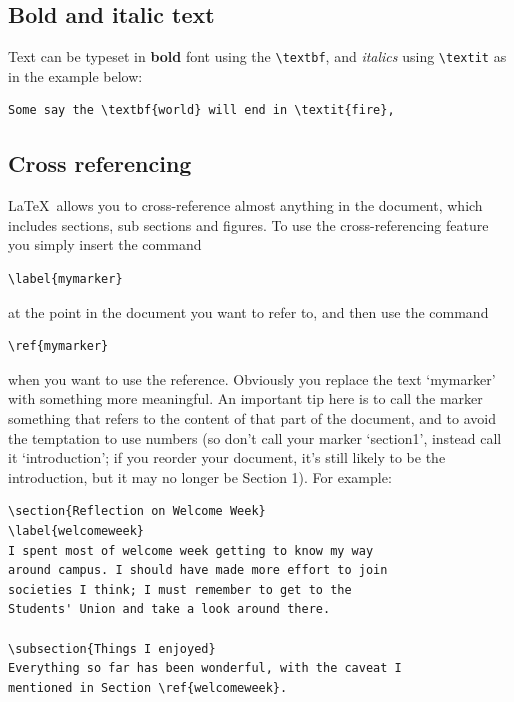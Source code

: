 \begin{refsection}
\subsection{Bold and italic text}
Text can be typeset in \textbf{bold} font using the \verb|\textbf|, and \textit{italics} using \verb|\textit| as in the example below:

\begin{verbatim}
Some say the \textbf{world} will end in \textit{fire},
\end{verbatim}

\subsection{Cross referencing}

\LaTeX\ allows you to cross-reference almost anything in the document, which includes sections, sub sections and figures. To use the cross-referencing feature you simply insert the command 
\begin{verbatim}
\label{mymarker}
\end{verbatim}
at the point in the document you want to refer to, and then use the command

\begin{verbatim}
\ref{mymarker}
\end{verbatim}
when you want to use the reference. Obviously you replace the text `mymarker' with something more meaningful. An important tip here is to call the marker something that refers to the content of that part of the document, and to avoid the temptation to use numbers (so don't call your marker `section1', instead call it `introduction'; if you reorder your document, it's still likely to be the introduction, but it may no longer be Section 1). For example:

\begin{verbatim}
\section{Reflection on Welcome Week}
\label{welcomeweek}
I spent most of welcome week getting to know my way
around campus. I should have made more effort to join
societies I think; I must remember to get to the
Students' Union and take a look around there.

\subsection{Things I enjoyed}
Everything so far has been wonderful, with the caveat I 
mentioned in Section \ref{welcomeweek}.


\end{verbatim}
\end{refsection}
